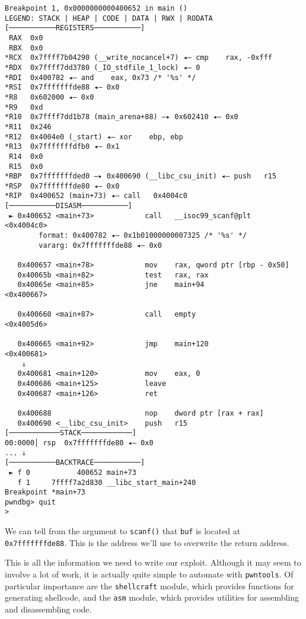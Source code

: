 \begin{lstlisting}
Breakpoint 1, 0x0000000000400652 in main ()
LEGEND: STACK | HEAP | CODE | DATA | RWX | RODATA
[───────────REGISTERS───────────]
 RAX  0x0
 RBX  0x0
*RCX  0x7ffff7b04290 (__write_nocancel+7) ◂— cmp    rax, -0xfff
*RDX  0x7ffff7dd3780 (_IO_stdfile_1_lock) ◂— 0
*RDI  0x400782 ◂— and    eax, 0x73 /* '%s' */
*RSI  0x7fffffffde88 ◂— 0x0
*R8   0x602000 ◂— 0x0
*R9   0xd
*R10  0x7ffff7dd1b78 (main_arena+88) —▸ 0x602410 ◂— 0x0
*R11  0x246
*R12  0x4004e0 (_start) ◂— xor    ebp, ebp
*R13  0x7fffffffdfb0 ◂— 0x1
 R14  0x0
 R15  0x0
*RBP  0x7fffffffded0 —▸ 0x400690 (__libc_csu_init) ◂— push   r15
*RSP  0x7fffffffde80 ◂— 0x0
*RIP  0x400652 (main+73) ◂— call   0x4004c0
[───────────DISASM───────────]
 ► 0x400652 <main+73>            call   __isoc99_scanf@plt            <0x4004c0>
        format: 0x400782 ◂— 0x1b01000000007325 /* '%s' */
        vararg: 0x7fffffffde88 ◂— 0x0
 
   0x400657 <main+78>            mov    rax, qword ptr [rbp - 0x50]
   0x40065b <main+82>            test   rax, rax
   0x40065e <main+85>            jne    main+94                       <0x400667>
 
   0x400660 <main+87>            call   empty                         <0x4005d6>
 
   0x400665 <main+92>            jmp    main+120                      <0x400681>
    ↓
   0x400681 <main+120>           mov    eax, 0
   0x400686 <main+125>           leave  
   0x400687 <main+126>           ret    
 
   0x400688                      nop    dword ptr [rax + rax]
   0x400690 <__libc_csu_init>    push   r15
[────────────STACK────────────]
00:0000│ rsp  0x7fffffffde80 ◂— 0x0
... ↓
[───────────BACKTRACE───────────]
 ► f 0           400652 main+73
   f 1     7ffff7a2d830 __libc_start_main+240
Breakpoint *main+73
pwndbg> quit
> 
\end{lstlisting}

We can tell from the argument to \texttt{scanf()} that \texttt{buf} is located
at \texttt{0x7fffffffde88}. This is the address we'll use to overwrite the
return address.

This is all the information we need to write our exploit. Although it may seem
to involve a lot of work, it is actually quite simple to automate with
\texttt{pwntools}. Of particular importance are the \texttt{shellcraft} module,
which provides functions for generating shellcode, and the \texttt{asm} module,
which provides utilities for assembling and disassembling code. 

